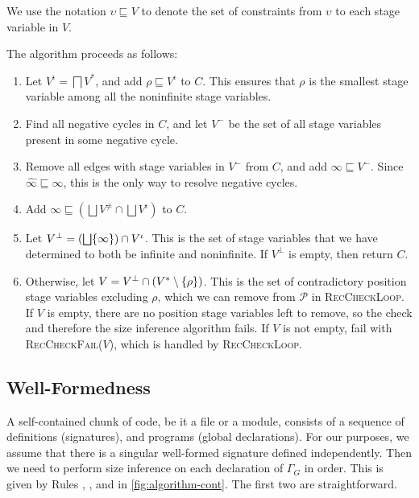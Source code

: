 \documentclass[nonacm,screen,10pt]{acmart}
\begin{document}
We use the notation $\upsilon \sqsubseteq V$ to denote the set of constraints from $\upsilon$ to each stage variable in $V$.

The algorithm proceeds as follows:

\begin{enumerate}
    \item Let $V^\iota = \bigsqcap V^*$, and add $\rho \sqsubseteq V^\iota$ to $C$. This ensures that $\rho$ is the smallest stage variable among all the noninfinite stage variables.
    \item Find all negative cycles in $C$, and let $V^-$ be the set of all stage variables present in some negative cycle.
    \item Remove all edges with stage variables in $V^-$ from $C$, and add $\infty \sqsubseteq V^-$. Since $\widehat{\infty} \sqsubseteq \infty$, this is the only way to resolve negative cycles.
    \item Add $\infty \sqsubseteq \left(\bigsqcup V^\neq \cap \bigsqcup V^\iota\right)$ to $C$.
    \item Let $V^\bot = \left(\bigsqcup \{\infty\}\right) \cap V^\iota$. This is the set of stage variables that we have determined to both be infinite and noninfinite. If $V^\bot$ is empty, then return $C$.
    \item Otherwise, let $V = V^\bot \cap (V^* \setminus \{\rho\})$. This is the set of contradictory position stage variables excluding $\rho$, which we can remove from $\mathcal{P}$ in \textsc{RecCheckLoop}. If $V$ is empty, there are no position stage variables left to remove, so the check and therefore the size inference algorithm fails. If $V$ is not empty, fail with \textsc{RecCheckFail}($V$), which is handled by \textsc{RecCheckLoop}.
\end{enumerate}

\subsection{Well-Formedness}



A self-contained chunk of code, be it a file or a module, consists of a sequence of \coinductive definitions (signatures), and programs (global declarations). For our purposes, we assume that there is a singular well-formed signature defined independently. Then we need to perform size inference on each declaration of $\Gamma_G$ in order. This is given by Rules , , and  in \autoref{fig:algorithm-cont}. The first two are straightforward.
\end{document}
